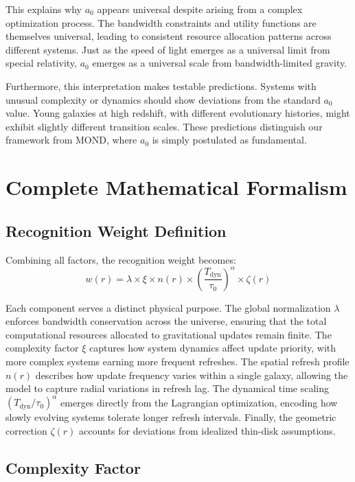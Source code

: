 \documentclass[twocolumn,prd,amsmath,amssymb,aps,superscriptaddress,nofootinbib]{revtex4-2}
\begin{document}
This explains why $a_0$ appears universal despite arising from a complex optimization process. The bandwidth constraints and utility functions are themselves universal, leading to consistent resource allocation patterns across different systems. Just as the speed of light emerges as a universal limit from special relativity, $a_0$ emerges as a universal scale from bandwidth-limited gravity.

Furthermore, this interpretation makes testable predictions. Systems with unusual complexity or dynamics should show deviations from the standard $a_0$ value. Young galaxies at high redshift, with different evolutionary histories, might exhibit slightly different transition scales. These predictions distinguish our framework from MOND, where $a_0$ is simply postulated as fundamental.

\section{Complete Mathematical Formalism}
\label{sec:formalism}

\subsection{Recognition Weight Definition}

Combining all factors, the recognition weight becomes:
\begin{equation}
w(r) = \lambda \times \xi \times n(r) \times \left(\frac{T_{\text{dyn}}}{\tau_0}\right)^\alpha \times \zeta(r)
\end{equation}

Each component serves a distinct physical purpose. The global normalization $\lambda$ enforces bandwidth conservation across the universe, ensuring that the total computational resources allocated to gravitational updates remain finite. The complexity factor $\xi$ captures how system dynamics affect update priority, with more complex systems earning more frequent refreshes. The spatial refresh profile $n(r)$ describes how update frequency varies within a single galaxy, allowing the model to capture radial variations in refresh lag. The dynamical time scaling $(T_{\text{dyn}}/\tau_0)^\alpha$ emerges directly from the Lagrangian optimization, encoding how slowly evolving systems tolerate longer refresh intervals. Finally, the geometric correction $\zeta(r)$ accounts for deviations from idealized thin-disk assumptions.

\subsection{Complexity Factor}
\end{document}
